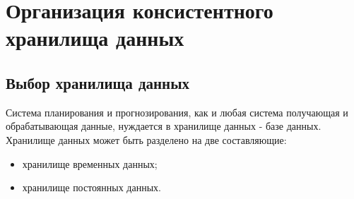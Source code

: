 \chapter{Организация консистентного хранилища данных}

\section*{Выбор хранилища данных}

\indent Система планирования и прогнозирования, как и любая система получающая и обрабатывающая данные, нуждается в хранилище данных - базе данных.
Хранилище данных может быть разделено на две составляющие:
\begin{itemize}
	\item хранилище временных данных;
	\item хранилище постоянных данных.
\end{itemize}

